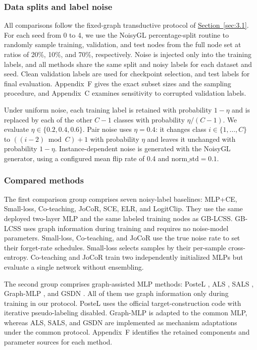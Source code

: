 \documentclass[10pt,letterpaper,nopreprintline]{elsarticle}
\theoremstyle{definition}
\theoremstyle{plain}
\begin{document}


\subsubsection{Data splits and label noise}\label{sec:4.1.2}

All comparisons follow the fixed-graph transductive protocol of \hyperref[sec:3.1]{Section~\ref*{sec:3.1}}. For each seed from 0 to 4, we use the NoisyGL percentage-split routine to randomly sample training, validation, and test nodes from the full node set at ratios of 20\%, 10\%, and 70\%, respectively. Noise is injected only into the training labels, and all methods share the same split and noisy labels for each dataset and seed. Clean validation labels are used for checkpoint selection, and test labels for final evaluation. Appendix~F gives the exact subset sizes and the sampling procedure, and Appendix~C examines sensitivity to corrupted validation labels.

Under uniform noise, each training label is retained with probability \(1-\eta\) and is replaced by each of the other \(C-1\) classes with probability \(\eta/(C-1)\). We evaluate \(\eta\in\{0.2,0.4,0.6\}\). Pair noise uses \(\eta=0.4\): it changes class \(i\in\{1,\ldots,C\}\) to \(((i-2)\bmod C)+1\) with probability \(\eta\) and leaves it unchanged with probability \(1-\eta\). Instance-dependent noise is generated with the NoisyGL generator, using a configured mean flip rate of 0.4 and \(\text{norm\_std}=0.1\).

\subsubsection{Compared methods}\label{sec:4.1.3}

The first comparison group comprises seven noisy-label baselines: MLP+CE, Small-loss, Co-teaching, JoCoR, SCE, ELR, and LogitClip. They use the same deployed two-layer MLP and the same labeled training nodes as GB-LCSS. GB-LCSS uses graph information during training and requires no noise-model parameters. Small-loss, Co-teaching, and JoCoR use the true noise rate to set their forget-rate schedules. Small-loss selects samples by their per-sample cross-entropy. Co-teaching and JoCoR train two independently initialized MLPs but evaluate a single network without ensembling.

The second group comprises graph-assisted MLP methods: PosteL \cite{ref54}, ALS \cite{ref55}, SALS \cite{ref56}, Graph-MLP \cite{ref3}, and GSDN \cite{ref40}. All of them use graph information only during training in our protocol. PosteL uses the official target-construction code with iterative pseudo-labeling disabled. Graph-MLP is adapted to the common MLP, whereas ALS, SALS, and GSDN are implemented as mechanism adaptations under the common protocol. Appendix~F identifies the retained components and parameter sources for each method.
\end{document}
